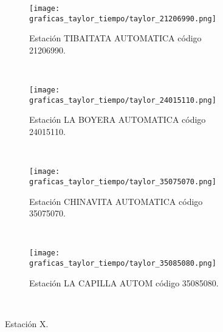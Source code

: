 \begin{figure}[H]
\centering
\begin{subfigure}[normla]{0.4\textwidth}
\texttt{[image: graficas\_taylor\_tiempo/taylor\_21206990.png]}
\caption{Estación TIBAITATA AUTOMATICA  código 21206990.}
\end{subfigure}
~
\begin{subfigure}[normla]{0.4\textwidth}
\texttt{[image: graficas\_taylor\_tiempo/taylor\_24015110.png]}
\caption{Estación LA BOYERA AUTOMATICA  código 24015110.}
\end{subfigure}
~
\begin{subfigure}[normla]{0.4\textwidth}
\texttt{[image: graficas\_taylor\_tiempo/taylor\_35075070.png]}
\caption{Estación CHINAVITA AUTOMATICA  código 35075070.}
\end{subfigure}
~
\begin{subfigure}[normla]{0.4\textwidth}
\texttt{[image: graficas\_taylor\_tiempo/taylor\_35085080.png]}
\caption{Estación LA CAPILLA AUTOM  código 35085080.}
\end{subfigure}
~
    \caption{Estación X.}
    \label{fig:my_label}
\end{figure}